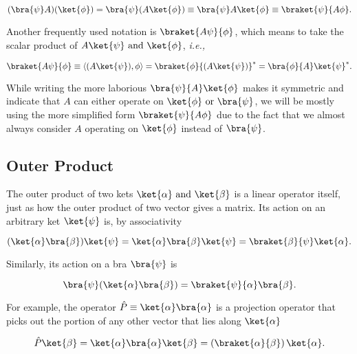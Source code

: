 \documentclass[a4paper,12pt]{report}
\begin{document}
\begin{equation}
  (\bra{\psi }A )(\ket{\phi } ) = \bra{\psi }(A\ket{\phi } ) \equiv \bra{\psi }A\ket{\phi } \equiv \braket{\psi }{A \phi  } .  
\end{equation}

Another frequently used notation is \(\braket{A \psi }{\phi } \), which means to take the scalar product of \(A \ket{\psi } \text { and } \ket{\phi }   \), \textit{i.e.,} 

\begin{equation}
  \braket{A \psi }{\phi } \equiv \left \langle {(A \ket{\psi }), \phi  } \right \rangle = \braket{\phi }{(A \ket{\psi } )}^* = \bra{\phi }{A}\ket{\psi }^*.  \label{herm1}   
\end{equation}

While writing the more laborious \(\bra{\psi }{A}\ket{\phi } \) makes it symmetric and indicate that \(A\) can either operate on \(\ket{\phi } \text { or }  \bra{\psi } \), we will be mostly using the more simplified form \(\braket{\psi }{A\phi } \) due to the fact that we almost always consider \(A\) operating on \(\ket{\phi } \) instead of \(\bra{\psi } \).

\subsection{Outer Product}

The outer product of two kets \(\ket{\alpha } \text { and } \ket{\beta }  \) is a linear operator itself, just as how the outer product of two vector gives a matrix. Its action on an arbitrary ket \(\ket{\psi } \) is, by associativity

\begin{equation}
  (\ket{\alpha }\bra{\beta }  ) \ket{\psi } =  \ket{\alpha }\bra{\beta }\ket{\psi } = \braket{\beta  }{\psi  } \ket{\alpha  }.     
\end{equation}

Similarly, its action on a bra \(\bra{\psi} \) is

\begin{equation}
  \bra{\psi }(\ket{\alpha }\bra{\beta }  ) = \braket{\psi }{\alpha } \bra{\beta }.  
\end{equation}

For example, the operator \(\hat{P} \equiv \ket{\alpha }\bra{\alpha }  \) is a projection operator that picks out the portion of any other vector that lies along \(\ket{\alpha } \)

\begin{equation}
  \hat{P} \ket{\beta } = \ket{\alpha }\bra{\alpha }\ket{\beta } = \left( \braket{\alpha }{\beta }  \right) \ket{\alpha }.     
\end{equation}
\end{document}
